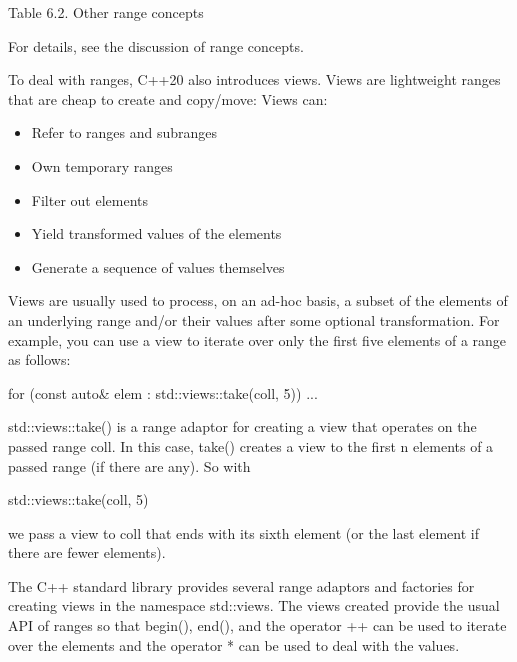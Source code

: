 \begin{center}
Table 6.2. Other range concepts
\end{center}

For details, see the discussion of range concepts.


To deal with ranges, C++20 also introduces views. Views are lightweight ranges that are cheap to create and copy/move: Views can:

\begin{itemize}
\item
Refer to ranges and subranges

\item
Own temporary ranges

\item
Filter out elements

\item
Yield transformed values of the elements

\item
Generate a sequence of values themselves
\end{itemize}

Views are usually used to process, on an ad-hoc basis, a subset of the elements of an underlying range and/or their values after some optional transformation. For example, you can use a view to iterate over only the first five elements of a range as follows:

\begin{cpp}
for (const auto& elem : std::views::take(coll, 5)) {
	...
}
\end{cpp}

std::views::take() is a range adaptor for creating a view that operates on the passed range coll. In this case, take() creates a view to the first n elements of a passed range (if there are any). So with

\begin{cpp}
std::views::take(coll, 5)
\end{cpp}

we pass a view to coll that ends with its sixth element (or the last element if there are fewer elements).

The C++ standard library provides several range adaptors and factories for creating views in the namespace std::views. The views created provide the usual API of ranges so that begin(), end(), and the operator ++ can be used to iterate over the elements and the operator * can be used to deal with the values.

